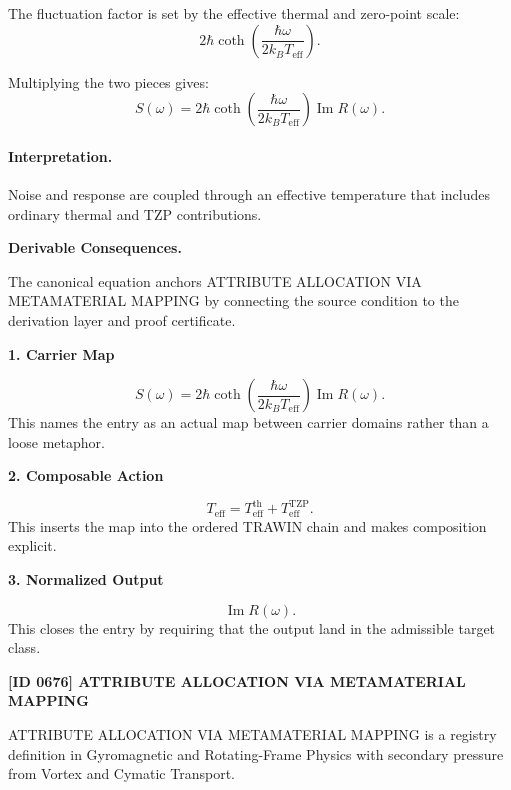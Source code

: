 The fluctuation factor is set by the effective thermal and zero-point scale:
\begin{equation}
2\hbar
\coth\left(
\frac{\hbar\omega}{2k_B T_{\mathrm{eff}}}
\right).
\end{equation}

Multiplying the two pieces gives:
\begin{equation}
\boxed{
S(\omega)
=
2\hbar
\coth\left(
\frac{\hbar\omega}{2k_B T_{\mathrm{eff}}}
\right)
\operatorname{Im}R(\omega).
}
\end{equation}

\paragraph{Interpretation.}
Noise and response are coupled through an effective temperature that includes ordinary thermal and TZP contributions.

\par\vspace{0.35em}
\noindent\textbf{Derivable Consequences.}\quad
\begingroup
\footnotesize
\raggedright
The canonical equation anchors ATTRIBUTE ALLOCATION VIA METAMATERIAL MAPPING by connecting the source condition to the derivation layer and proof certificate.
\par\endgroup

\noindent\textbf{1. Carrier Map}\par
\[
S(\omega) = 2\hbar \coth\left( \frac{\hbar\omega}{2k_B T_{\mathrm{eff}}} \right) \operatorname{Im}R(\omega).
\]
\noindent This names the entry as an actual map between carrier domains rather than a loose metaphor.\par
\noindent\textbf{2. Composable Action}\par
\[
T_{\mathrm{eff}} = T_{\mathrm{eff}}^{\mathrm{th}} + T_{\mathrm{eff}}^{\mathrm{TZP}}.
\]
\noindent This inserts the map into the ordered TRAWIN chain and makes composition explicit.\par
\noindent\textbf{3. Normalized Output}\par
\[
\operatorname{Im}R(\omega).
\]
\noindent This closes the entry by requiring that the output land in the admissible target class.\par

\clearpage
\noindent\textbf{[ID 0676] ATTRIBUTE ALLOCATION VIA METAMATERIAL MAPPING}\par
\vspace{0.35em}
\begingroup\small
{}
ATTRIBUTE ALLOCATION VIA METAMATERIAL MAPPING is a registry definition in Gyromagnetic and Rotating-Frame Physics with secondary pressure from Vortex and Cymatic Transport.

